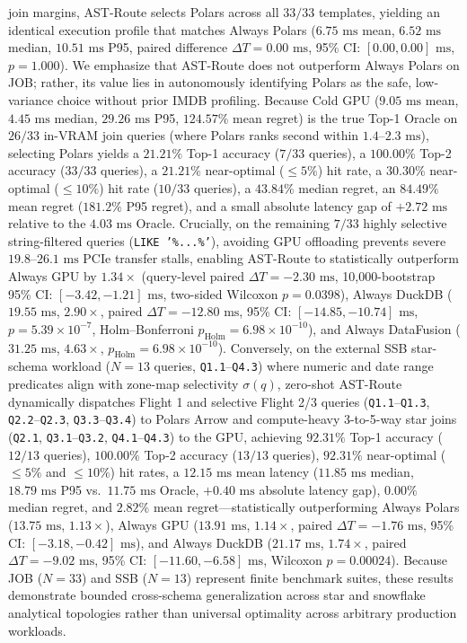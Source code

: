 \documentclass[10pt,a4paper]{article}
\begin{document}
\begin{enumerate}[leftmargin=1.5em,itemsep=2pt]
join margins, AST-Route selects Polars across all $33/33$ templates, yielding an identical execution profile that matches Always Polars ($6.75\text{ ms}$ mean, $6.52\text{ ms}$ median, $10.51\text{ ms}$ P95, paired difference $\Delta T = 0.00\text{ ms}$, 95\% CI: $[0.00, 0.00]\text{ ms}$, $p=1.000$). We emphasize that AST-Route does not outperform Always Polars on JOB; rather, its value lies in autonomously identifying Polars as the safe, low-variance choice without prior IMDB profiling. Because Cold GPU ($9.05\text{ ms}$ mean, $4.45\text{ ms}$ median, $29.26\text{ ms}$ P95, $124.57\%$ mean regret) is the true Top-1 Oracle on $26/33$ in-VRAM join queries (where Polars ranks second within $1.4\text{--}2.3\text{ ms}$), selecting Polars yields a $21.21\%$ Top-1 accuracy ($7/33$ queries), a $100.00\%$ Top-2 accuracy ($33/33$ queries), a $21.21\%$ near-optimal ($\le 5\%$) hit rate, a $30.30\%$ near-optimal ($\le 10\%$) hit rate ($10/33$ queries), a $43.84\%$ median regret, an $84.49\%$ mean regret ($181.2\%$ P95 regret), and a small absolute latency gap of $+2.72\text{ ms}$ relative to the $4.03\text{ ms}$ Oracle. Crucially, on the remaining $7/33$ highly selective string-filtered queries (\texttt{LIKE '\%...\%'}), avoiding GPU offloading prevents severe $19.8\text{--}26.1\text{ ms}$ PCIe transfer stalls, enabling AST-Route to statistically outperform Always GPU by $1.34\times$ (query-level paired $\Delta T = -2.30\text{ ms}$, 10,000-bootstrap 95\% CI: $[-3.42, -1.21]\text{ ms}$, two-sided Wilcoxon $p=0.0398$), Always DuckDB ($19.55\text{ ms}$, $2.90\times$, paired $\Delta T = -12.80\text{ ms}$, 95\% CI: $[-14.85, -10.74]\text{ ms}$, $p=5.39\times 10^{-7}$, Holm--Bonferroni $p_{\text{Holm}}=6.98\times 10^{-10}$), and Always DataFusion ($31.25\text{ ms}$, $4.63\times$, $p_{\text{Holm}}=6.98\times 10^{-10}$). Conversely, on the external SSB star-schema workload ($N=13$ queries, \texttt{Q1.1}--\texttt{Q4.3}) where numeric and date range predicates align with zone-map selectivity $\sigma(q)$, zero-shot AST-Route dynamically dispatches Flight 1 and selective Flight 2/3 queries (\texttt{Q1.1}--\texttt{Q1.3}, \texttt{Q2.2}--\texttt{Q2.3}, \texttt{Q3.3}--\texttt{Q3.4}) to Polars Arrow and compute-heavy 3-to-5-way star joins (\texttt{Q2.1}, \texttt{Q3.1}--\texttt{Q3.2}, \texttt{Q4.1}--\texttt{Q4.3}) to the GPU, achieving $92.31\%$ Top-1 accuracy ($12/13$ queries), $100.00\%$ Top-2 accuracy ($13/13$ queries), $92.31\%$ near-optimal ($\le 5\%$ and $\le 10\%$) hit rates, a $12.15\text{ ms}$ mean latency ($11.85\text{ ms}$ median, $18.79\text{ ms}$ P95 vs.\ $11.75\text{ ms}$ Oracle, $+0.40\text{ ms}$ absolute latency gap), $0.00\%$ median regret, and $2.82\%$ mean regret---statistically outperforming Always Polars ($13.75\text{ ms}$, $1.13\times$), Always GPU ($13.91\text{ ms}$, $1.14\times$, paired $\Delta T = -1.76\text{ ms}$, 95\% CI: $[-3.18, -0.42]\text{ ms}$), and Always DuckDB ($21.17\text{ ms}$, $1.74\times$, paired $\Delta T = -9.02\text{ ms}$, 95\% CI: $[-11.60, -6.58]\text{ ms}$, Wilcoxon $p=0.00024$). Because JOB ($N=33$) and SSB ($N=13$) represent finite benchmark suites, these results demonstrate bounded cross-schema generalization across star and snowflake analytical topologies rather than universal optimality across arbitrary production workloads.

\end{enumerate}
\end{document}
